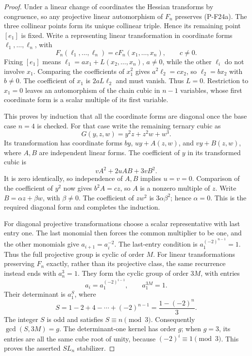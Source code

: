 \begin{proof}
Under a linear change of coordinates the Hessian transforms by
congruence, so any projective linear automorphism of $F_n$
preserves (P-F24a). The three collinear points form its unique
collinear triple. Hence its remaining point $[e_1]$ is fixed.
Write a representing linear transformation in coordinate forms
$\ell_1,\ldots,\ell_n$, with
\[
 F_n(\ell_1,\ldots,\ell_n)=cF_n(x_1,\ldots,x_n),\qquad c\ne0.
\]
Fixing $[e_1]$ means $\ell_1=ax_1+L(x_2,\ldots,x_n)$,
$a\ne0$, while the other $\ell_i$ do not involve $x_1$.
Comparing the coefficients of $x_1^2$ gives
$a^2\ell_2=cx_2$, so $\ell_2=bx_2$ with $b\ne0$.
The coefficient of $x_1$ is $2aL\ell_2$ and must vanish.
Thus $L=0$. Restriction to $x_1=0$ leaves an automorphism
of the chain cubic in $n-1$ variables, whose first coordinate
form is a scalar multiple of its first variable.

This proves by induction that all the coordinate forms are
diagonal once the base case $n=4$ is checked. For that case
write the remaining ternary cubic as
\[
 G(y,z,w)=y^2z+z^2w+w^3.
\]
Its transformation has coordinate forms $by$, $uy+A(z,w)$,
and $vy+B(z,w)$, where $A,B$ are independent linear forms.
The coefficient of $y$ in its transformed cubic is
\[
 vA^2+2uAB+3vB^2.
\]
It is zero identically, so independence of $A,B$ implies
$u=v=0$. Comparison of the coefficient of $y^2$ now gives
$b^2A=cz$, so $A$ is a nonzero multiple of $z$.
Write $B=\alpha z+\beta w$, with $\beta\ne0$. The
coefficient of $zw^2$ is $3\alpha\beta^2$; hence
$\alpha=0$. This is the required diagonal form and completes
the induction.

For diagonal projective transformations choose a scalar
representative with last entry one. The last monomial then
forces the common multiplier to be one, and the other
monomials give $a_{i+1}=a_i^{-2}$. The last-entry condition is
$a_1^{(-2)^{n-1}}=1$. Thus the full projective group is
cyclic of order $M$. For linear transformations preserving
$F_n$ exactly, rather than its projective class, the same
recurrence instead ends with $a_n^3=1$. They form the
cyclic group of order $3M$, with entries
\[
 a_i=a_1^{(-2)^{i-1}},\qquad a_1^{3M}=1.
\]
Their determinant is $a_1^S$, where
\[
 S=1-2+4-\cdots+(-2)^{n-1}
   =\frac{1-(-2)^n}{3}.
\]
The integer $S$ is odd and satisfies $S\equiv n\pmod3$.
Consequently $\gcd(S,3M)=g$. The determinant-one kernel
has order $g$; when $g=3$, its entries are all the same
cube root of unity, because $(-2)^i\equiv1\pmod3$.
This proves the asserted $SL_n$ stabilizer.


\end{proof}
